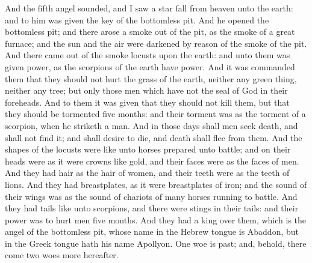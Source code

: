  And the fifth angel sounded, and I saw a star fall from
heaven unto the earth: and to him was given the key of the bottomless
pit.  And he opened the bottomless pit; and there arose a
smoke out of the pit, as the smoke of a great furnace; and the sun and
the air were darkened by reason of the smoke of the pit. 
And there came out of the smoke locusts upon the earth: and unto them
was given power, as the scorpions of the earth have power. 
And it was commanded them that they should not hurt the grass of the
earth, neither any green thing, neither any tree; but only those men
which have not the seal of God in their foreheads.  And to
them it was given that they should not kill them, but that they should
be tormented five months: and their torment was as the torment of a
scorpion, when he striketh a man.  And in those days shall
men seek death, and shall not find it; and shall desire to die, and
death shall flee from them.  And the shapes of the locusts
were like unto horses prepared unto battle; and on their heads were as
it were crowns like gold, and their faces were as the faces of men.
 And they had hair as the hair of women, and their teeth
were as the teeth of lions.  And they had breastplates, as
it were breastplates of iron; and the sound of their wings was as the
sound of chariots of many horses running to battle.  And
they had tails like unto scorpions, and there were stings in their
tails: and their power was to hurt men five months.  And
they had a king over them, which is the angel of the bottomless pit,
whose name in the Hebrew tongue is Abaddon, but in the Greek tongue hath
his name Apollyon.  One woe is past; and, behold, there
come two woes more hereafter.

